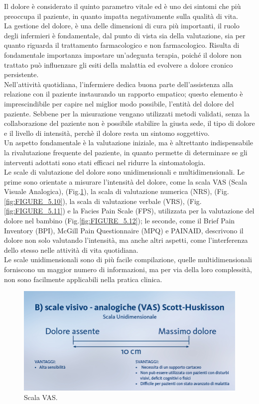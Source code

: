 Il dolore è considerato il quinto parametro vitale ed è uno dei sintomi che più preoccupa il paziente, 
in quanto impatta negativamente sulla qualità di vita.\\ La gestione del dolore, 
è una delle dimensioni di cura più importanti, il ruolo degli infermieri è fondamentale, 
dal punto di vista sia della valutazione, sia per quanto riguarda il trattamento farmacologico e non farmacologico. 
Risulta di fondamentale importanza impostare un’adeguata terapia, poiché il dolore non trattato può 
influenzare gli esiti della malattia ed evolvere a dolore cronico persistente.\\
Nell'attività quotidiana, l'infermiere dedica buona parte dell'assistenza alla relazione con il paziente instaurando
un rapporto empatico; questo elemento è imprescindibile per capire nel miglior modo possibile, l'entità del
dolore del paziente. Sebbe­ne per la misurazione vengano utilizzati metodi validati, senza la collabo­razione del 
paziente non è possibile stabilire la giusta sede, il tipo di dolo­re e il livello di intensità, 
perchè il dolore resta un sintomo soggettivo\cite{BOOK3}.\\
Un aspetto fondamentale è la valutazione iniziale, ma è altret­tanto indispensabile la rivalutazione frequente del paziente, 
in quanto permette di determinare se gli interventi adottati sono stati effi­caci nel ridurre la 
sintomatologia\cite{BOOK3}.\\ 
Le scale di valutazione del dolore sono unidimensionali e multidimensionali.
Le prime sono orientate a misurare l'intensità del dolore, come 
la scala VAS (Scala Visuale Analogica), (Fig.\ref{fig:FIGURE_5.9}), 
la scala di valutazione numerica (NRS), (Fig.\ref{fig:FIGURE_5.10}),
la scala di valutazione verbale (VRS), (Fig.\ref{fig:FIGURE_5.11}) e la Facies Pain Scale (FPS), utilizzata
per la valutazione del dolore nel bambino (Fig.\ref{fig:FIGURE_5.12});
le seconde, come il Brief Pain Inventory (BPI), McGill Pain Questionnaire (MPQ) 
e PAINAID, descrivono il dolore non solo valutando l'intensità, ma anche altri aspetti, 
come l'interferenza dello stesso nelle attività di vita quotidiana.\\ Le scale unidimensionali sono di più 
facile compilazione, quelle multidimensionali forniscono un maggior numero di informazioni, ma per via della loro 
complessità, non sono facilmente applicabili nella pratica clinica\cite{BOOK3}.

\begin{figure}[H]
    \begin{center}
    \includegraphics[width=0.6\columnwidth]{img/VAS.jpeg}
    \vspace{-3mm}
    \end{center}
    \caption{Scala VAS.
    \cite{SCALEDOLORE}}
    \label{fig:FIGURE_5.9}
\end{figure}

